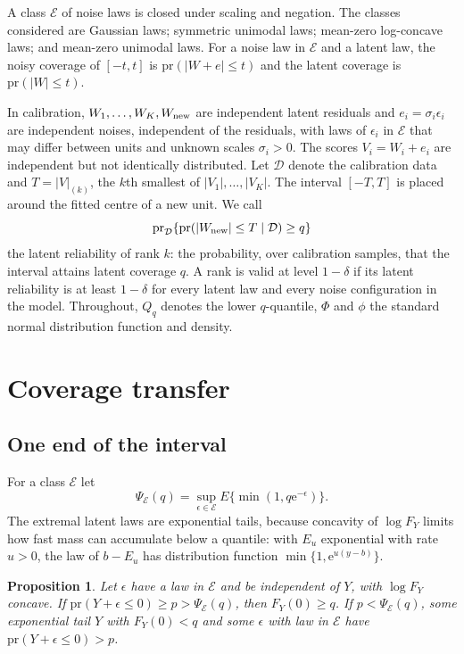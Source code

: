 \documentclass[12pt]{article}
\newtheorem{proposition}{Proposition}
\theoremstyle{definition}
\newcommand{\pr}{\mathrm{pr}}
\newcommand{\E}{\mathcal{E}}
\begin{document}
A class $\E$ of noise laws is closed under scaling and negation. The classes considered are Gaussian laws; symmetric unimodal laws; mean-zero log-concave laws; and mean-zero unimodal laws. For a noise law in $\E$ and a latent law, the noisy coverage of $[-t, t]$ is $\pr(|W + e| \le t)$ and the latent coverage is $\pr(|W| \le t)$.

In calibration, $W_1, \ldots, W_K, W_{\rm new}$ are independent latent residuals and $e_i = \sigma_i\epsilon_i$ are independent noises, independent of the residuals, with laws of $\epsilon_i$ in $\E$ that may differ between units and unknown scales $\sigma_i > 0$. The scores $V_i = W_i + e_i$ are independent but not identically distributed. Let $\mathcal D$ denote the calibration data and $T = |V|_{(k)}$, the $k$th smallest of $|V_1|, \ldots, |V_K|$. The interval $[-T, T]$ is placed around the fitted centre of a new unit. We call
\[
\pr_{\mathcal D}\{\pr(|W_{\rm new}| \le T \mid \mathcal D) \ge q\}
\]
the latent reliability of rank $k$: the probability, over calibration samples, that the interval attains latent coverage $q$. A rank is valid at level $1 - \delta$ if its latent reliability is at least $1 - \delta$ for every latent law and every noise configuration in the model. Throughout, $Q_q$ denotes the lower $q$-quantile, $\Phi$ and $\phi$ the standard normal distribution function and density.

\section{Coverage transfer}\label{sec:transfer}

\subsection{One end of the interval}

For a class $\E$ let
\begin{equation}\label{eq:psi}
\Psi_{\E}(q) = \sup_{\epsilon \in \E} E\{\min(1, q \mathrm{e}^{-\epsilon})\}.
\end{equation}
The extremal latent laws are exponential tails, because concavity of $\log F_Y$ limits how fast mass can accumulate below a quantile: with $E_u$ exponential with rate $u > 0$, the law of $b - E_u$ has distribution function $\min\{1, \mathrm{e}^{u(y - b)}\}$.

\begin{proposition}\label{prop:general}
Let $\epsilon$ have a law in $\E$ and be independent of $Y$, with $\log F_Y$ concave. If $\pr(Y + \epsilon \le 0) \ge p > \Psi_{\E}(q)$, then $F_Y(0) \ge q$. If $p < \Psi_{\E}(q)$, some exponential tail $Y$ with $F_Y(0) < q$ and some $\epsilon$ with law in $\E$ have $\pr(Y + \epsilon \le 0) > p$.
\end{proposition}
\end{document}
